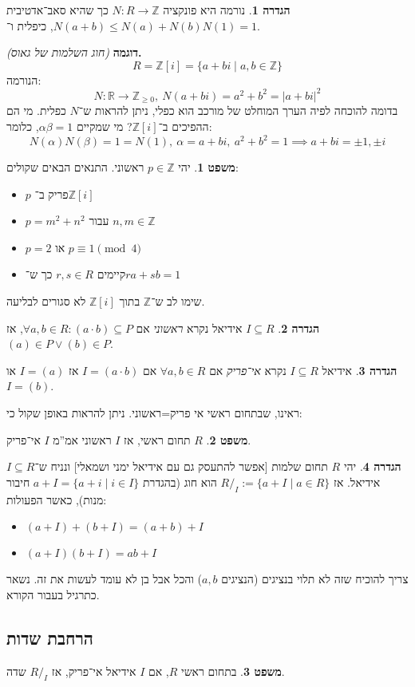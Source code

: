 \documentclass[a4paper]{article}
\newcommand\Z     {\mathbb{Z}}
\newcommand\R     {\mathbb{R}}
\newcommand\co        {\colon}
\newcommand\ag        {\alpha}
\newcommand\bg        {\beta}
\theoremstyle{definition}
\newtheorem{Theorem}{משפט}
\newtheorem{definition}{הגדרה}
\newcommand\theo  [1] {\begin{Theorem}#1\end{Theorem}}
\newcommand\defi  [1] {\begin{definition}#1\end{definition}}
\begin{document}
	\defi{נורמה היא פונקציה $N \co R \to \Z$ כך שהיא סאב־אדטיבית $N(a + b) \le N(a) + N(b)$, כיפלית ו־$N(1) =1$. }
	
	\textbf{דוגמה }\textit{(חוג השלמות של גאוס)}\textbf{. }
	\[ R = \Z[i] = \{a + bi \mid a, b \in \Z\} \]
	הנורמה: 
	\[ N \co \R\to \Z_{\ge 0}, \ N(a + bi) = a^2 + b^2 = |a + bi|^2 \]
	בדומה להוכחה לפיה הערך המוחלט של מורכב הוא כפלי, ניתן להראות ש־$N$ כפלית. מי הם ההפיכים ב־$\Z[i]$? מי שמקיים $\ag \bg = 1$, כלומר: 
	\[ N(\ag)N(\bg) = 1 = N(1), \ \ag = a + bi, \ a^2 + b^2 = 1 \implies a + bi = \pm 1, \pm i \]
	
	\theo{יהי $p \in \Z$ ראשוני. התנאים הבאים שקולים: 
		\begin{itemize}
			\item $p$ פריק ב־$\Z[i]$
			\item $p = m^2 + n^2$ עבור $n, m \in \Z$
			\item $p = 2$ או $p \equiv 1 \pmod{4} $
			\item קיימים $r, s \in R$ כך ש־$ra + sb = 1$
	\end{itemize}}
	
	שימו לב ש־$\Z$ בתוך $\Z[i]$ לא סגורים לבליעה. 
	
	\defi{$I \subseteq R$ אידיאל נקרא \textit{ראשוני} אם $\forall a, b \in R \co (a \cdot b) \subseteq P$, אז $(a) \in P \lor (b) \in P$. }
	\defi{אידיאל $I \subseteq R$ נקרא \textit{אי־פריק} אם $\forall a, b \in R$ אם $I = (a \cdot b)$ אז $I = (a)$ או $I = (b)$. }
	ראינו, שבתחום ראשי אי פריק=ראשוני. ניתן להראות באופן שקול כי: 
	\theo{$R$ תחום ראשי, אז $I$ ראשוני אמ''מ $I$ אי־פריק. }
	\defi{יהי $R$ תחום שלמות [אפשר להתעסק גם עם אידיאל ימני ושמאלי] ונניח ש־$I \subseteq R$ אידיאל. אז $R/_I := \{a + I \mid a \in R\}$ הוא חוג (בהגדרת $a + I = \{a + i \mid i \in I\}$ חיבור מנות), כאשר הפעולות: 
		\begin{itemize}
			\item $(a + I) + (b + I) = (a + b) + I$
			\item $(a + I)(b + I) = ab + I$
	\end{itemize}}
	צריך להוכיח שזה לא תלוי בנציגים (הנציגים $a, b$) והכל אבל בן לא עומד לעשות את זה. נשאר כתרגיל בעבור הקורא. 
	
	\subsection{הרחבת שדות}
	\theo{בתחום ראשי $R$, אם $I$ אידיאל אי־פריק, אז $R/_I$ שדה. }
	
\end{document}
